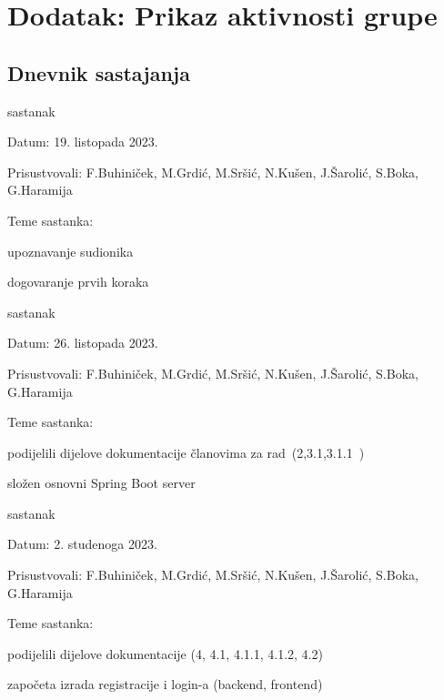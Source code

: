 \chapter*{Dodatak: Prikaz aktivnosti grupe}
		
		\section*{Dnevnik sastajanja}
		
		
		\begin{packed_enum}
			\item  sastanak
			
			\item[] \begin{packed_item}
				\item Datum: 19. listopada 2023.
				\item Prisustvovali: F.Buhiniček, M.Grdić, M.Sršić, N.Kušen, J.Šarolić, S.Boka, G.Haramija
				\item Teme sastanka:
				\begin{packed_item}
					\item  upoznavanje sudionika 
					\item  dogovaranje prvih koraka
				\end{packed_item}
			\end{packed_item}
			
			\item  sastanak
			\item[] \begin{packed_item}
				\item Datum: 26. listopada 2023.
				\item Prisustvovali: F.Buhiniček, M.Grdić, M.Sršić, N.Kušen, J.Šarolić, S.Boka, G.Haramija
				\item Teme sastanka:
				\begin{packed_item}
					\item  podijelili dijelove dokumentacije članovima za rad (2,3.1,3.1.1 )
					\item  složen osnovni Spring Boot server
				\end{packed_item}
			\end{packed_item}
			
						\item  sastanak
			\item[] \begin{packed_item}
				\item Datum:  2. studenoga 2023.
				\item Prisustvovali: F.Buhiniček, M.Grdić, M.Sršić, N.Kušen, J.Šarolić, S.Boka, G.Haramija
				\item Teme sastanka:
				\begin{packed_item}
					\item  podijelili dijelove dokumentacije (4, 4.1, 4.1.1, 4.1.2, 4.2)
					\item  započeta izrada registracije i login-a (backend, frontend)
				\end{packed_item}
			\end{packed_item}
			

\end{packed_enum}
